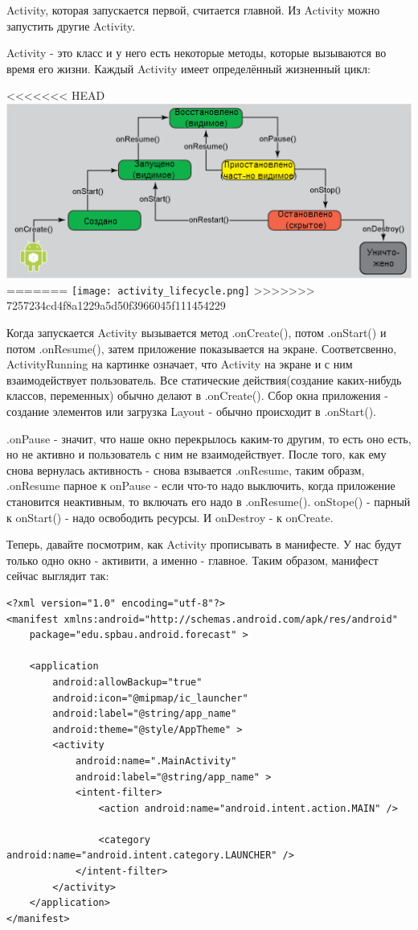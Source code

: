 \documentclass[12 pt]{article}
\begin{document}
    Activity, которая запускается первой, считается главной. Из Activity можно запустить другие Activity.

    Activity - это класс и у него есть некоторые методы, которые вызываются во время его жизни. Каждый Activity имеет определённый жизненный цикл:

<<<<<<< HEAD
	\includegraphics{LifeCycle.png}
=======
	\texttt{[image: activity\_lifecycle.png]}
>>>>>>> 7257234cd4f8a1229a5d50f3966045f111454229
	
	Когда запускается Activity вызывается метод .onCreate(), потом .onStart() и потом .onResume(), затем приложение показывается на экране. Соответсвенно, ActivityRunning на картинке означает, что Activity на экране и с ним взаимодействует пользователь. Все статические действия(создание каких-нибудь классов, переменных) обычно делают в .onCreate(). Сбор окна приложения - создание элементов или загрузка Layout - обычно происходит в .onStart().
	
	.onPause - значит, что наше окно перекрылось каким-то другим, то есть оно есть, но не активно и пользователь с ним не взаимодействует. После того, как ему снова вернулась активность - снова взывается .onResume, таким образм, .onResume парное к onPause - если что-то надо выключить, когда приложение становится неактивным, то включать его надо в .onResume(). onStope() - парный к onStart() - надо освободить ресурсы. И onDestroy - к onCreate.
	
	Теперь, давайте посмотрим, как Activity прописывать в манифесте. У нас будут только одно окно - активити, а именно - главное. Таким образом, манифест сейчас выглядит так:
	
	\begin{lstlisting}
<?xml version="1.0" encoding="utf-8"?>
<manifest xmlns:android="http://schemas.android.com/apk/res/android"
    package="edu.spbau.android.forecast" >

    <application
        android:allowBackup="true"
        android:icon="@mipmap/ic_launcher"
        android:label="@string/app_name"
        android:theme="@style/AppTheme" >
        <activity
            android:name=".MainActivity"
            android:label="@string/app_name" >
            <intent-filter>
                <action android:name="android.intent.action.MAIN" />

                <category android:name="android.intent.category.LAUNCHER" />
            </intent-filter>
        </activity>    
    </application>
</manifest>
    \end{lstlisting}
    
\end{document}
